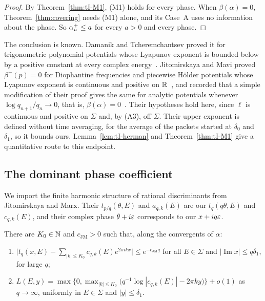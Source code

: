 \begin{proof}
By Theorem~\ref{thm:tI-M1}, (M1) holds for every phase. When $\beta(\alpha)=0$, Theorem~\ref{thm:covering} needs (M1) alone, and its Case~A uses no information about the phase. So $\alpha_u^+\le a$ for every $a>0$ and every phase.
\end{proof}

The conclusion is known. Damanik and Tcheremchantsev proved it for trigonometric polynomial potentials whose Lyapunov exponent is bounded below by a positive constant at every complex energy~\cite[Theorem~5]{DT2007}. Jitomirskaya and Mavi proved $\beta^+(p)=0$ for Diophantine frequencies and piecewise H\"older potentials whose Lyapunov exponent is continuous and positive on $\mathbb R$~\cite[Theorem~1.7]{JitomirskayaMavi2017}, and recorded that a simple modification of their proof gives the same for analytic potentials whenever $\log q_{n+1}/q_n\to0$, that is, $\beta(\alpha)=0$~\cite[Remark~1.12]{JitomirskayaMavi2017}. Their hypotheses hold here, since $\ell$ is continuous and positive on $\Sigma$ and, by (A3), off $\Sigma$. Their upper exponent is defined without time averaging, for the average of the packets started at $\delta_0$ and $\delta_1$, so it bounds ours. Lemma~\ref{lem:tI-herman} and Theorem~\ref{thm:tI-M1} give a quantitative route to this endpoint.

\subsection{The dominant phase coefficient}\label{sec:tI-C3}

We import the finite harmonic structure of rational discriminants from Jitomirskaya and Marx. Their $t_{p/q}(\theta,E)$ and $a_{q,k}(E)$ are our $t_q(q\theta,E)$ and $c_{q,k}(E)$, and their complex phase $\theta+i\varepsilon$ corresponds to our $x+iq\varepsilon$.

\begin{lemma}\label{lem:tI-JM}
There are $K_0\in\mathbb N$ and $c_{\mathrm{JM}}>0$ such that, along the convergents of $\alpha$:
\begin{enumerate}
\item $\bigl|t_q(x,E)-\sum_{|k|\le K_0}c_{q,k}(E)e^{2\pi ikx}\bigr|\le e^{-c_{\mathrm{JM}}q}$ for all $E\in\Sigma$ and $|\operatorname{Im}x|\le q\delta_1$, for large $q$;
\item $L(E,y)=\max\bigl\{0,\max_{|k|\le K_0}\bigl(q^{-1}\log|c_{q,k}(E)|-2\pi ky\bigr)\bigr\}+o(1)$ as $q\to\infty$, uniformly in $E\in\Sigma$ and $|y|\le\delta_1$.
\end{enumerate}
\end{lemma}

